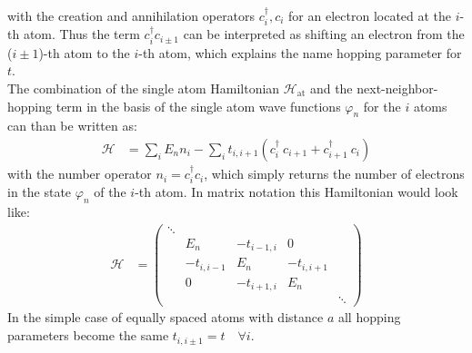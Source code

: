 with the creation and annihilation operators $c^\dagger_i, c_i$ for an electron located at the $i$-th atom. Thus the term $c_i^\dagger c_{i\pm1}$ can be interpreted as shifting an electron from the ($i\pm1$)-th atom to the $i$-th atom, which explains the name hopping parameter for $t$.\\
The combination of the single atom Hamiltonian $\mathcal{H}_\text{at}$ and the next-neighbor-hopping term in the basis of the single atom wave functions $\varphi_n$ for the $i$ atoms can than be written as:
\begin{align}
	\mathcal{H} &= \sum_i E_n n_i - \sum_i t_{i, i+1} \left(c_i^\dagger\  c_{i+1} + c_{i+1}^\dagger\  c_i\right)
\end{align}
with the number operator $n_i = c^\dagger_i c_i$, which simply returns the number of electrons in the state $\varphi_n$ of the $i$-th atom. In matrix notation this Hamiltonian would look like:
\begin{align}
	\mathcal{H} &= \begin{pmatrix*}
	\ddots&&&\\
	&E_n&-t_{i-1, i}&0\\
	&-t_{i, i-1}&E_n&-t_{i, i+1}\\
	&0&-t_{i+1, i}&E_n&\\
	&&&&\ddots
	\end{pmatrix*}
\end{align}
In the simple case of equally spaced atoms with distance $a$ all hopping parameters become the same $t_{i, i\pm1} = t\quad\forall  i$. 

